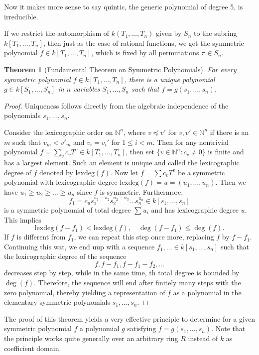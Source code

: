 \documentclass[12pt]{report}
\newtheorem{theorem}{Theorem}[section]
\theoremstyle{definition}
\newcommand{\lex}{\mbox{lexdeg}}
\newcommand{\NN}{\mathbb{N}}
\begin{document}
Now it makes more sense to say quintic, the generic polynomial of degree 5, is irreducible.


If we restrict the automorphism of $k(T_1,\dots,T_n)$ given by $S_n$ to the subring $k[T_1,\dots,T_n]$, then just as the case of rational functions, we get the symmetric polynomial $f\in k[T_1,\dots,T_n]$, which is fixed by all permutations $\pi\in S_n$.

\begin{theorem}[Fundamental Theorem on Symmetric Polynomials]
	For every symmetric polynomial $f\in k[T_1,\dots,T_n]$, there is a unique polynomial $g\in k[S_1,\dots,S_n]$ in $n$ variables $S_1,\dots,S_n$ such that $f=g(s_1,\dots,s_n)$.
\end{theorem}

\begin{proof}
	Uniqueness follows directly from the algebraic independence of the polynomials $s_1,\dots,s_n$.


	Consider the lexicographic order on $\NN^n$, where $v\preceq v'$ for $v,v'\in \NN^n$ if there is an $m$ such that $v_m<v'_m$ and $v_i=v_i'$ for $1\leq i<m$. Then for any nontrivial polynomial $f=\sum_{v} c_vT^v\in k[T_1,\dots, T_n]$, then set $\{v\in \NN^n: c_v\not=0\}$ is finite and has a largest element. Such an element is unique and called the lexicographic degree of $f$ denoted by $\lex(f)$. Now let $f= \sum c_v T^v$ be a symmetric polynomial with lexicographic degree $\lex(f)=u=(u_1,\dots,u_n)$. Then we have $u_1\geq u_2\geq \dots\geq u_n$ since $f$ is symmetric. Furthermore, $$f_1=c_u s_1^{u_1-u_2} s_2^{u_2-u_3}\dots s_n^{u_n}\in k[s_1,\dots,s_n]$$ is a symmetric polynomial of total degree $\sum u_i$ and has lexicographic degree $u$. This implies
	$$\lex(f-f_1)<\lex(f),\quad \deg(f-f_1)\leq \deg(f).$$
	If $f$ is different from $f_1$, we can repeat this step once more, replacing $f$ by $f-f_1$. Continuing this wat, we end uup with a sequence $f_1,\dots \in k[s_1,\dots,s_n]$ such that the lexicographic degree of the sequence
	$$f,f-f_1,f-f_1-f_2,\dots$$ decreases step by step, while in the same time, th total degree is bounded by $\deg(f)$. Therefore, the sequence will end after finitely many steps with the zero polynomial, thereby yielding a representation of $f$ as a polynomial in the elementary symmetric polynomials $s_1,\dots,s_n$.
\end{proof}


The proof of this theorem yields a very effective principle to determine for a given symmetric polynomial $f$ a polynomial $g$ satisfying $f = g(s_1,\dots,s_n).$ Note that the principle works quite generally over an arbitrary ring $R$ instead of $k$ as coefficient domain.
\end{document}
